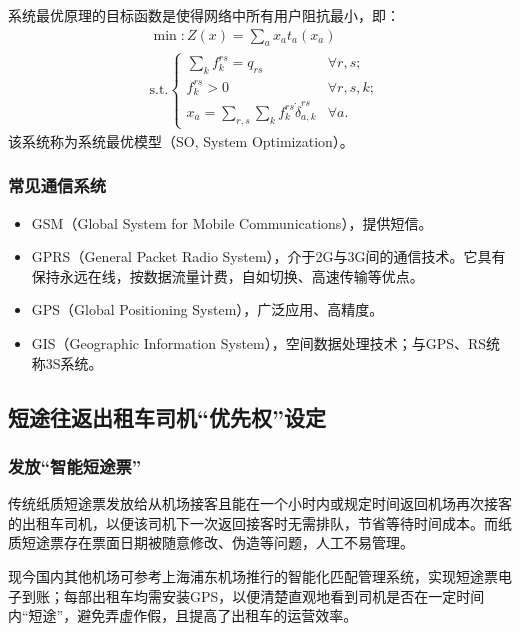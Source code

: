 系统最优原理的目标函数是使得网络中所有用户阻抗最小，即：
\begin{equation}\label{eq:最小用户阻抗}
    \begin{aligned}
        & \min: Z(x) = \sum_{a}x_{a}t_{a}(x_a) \\
        & \text{s.t.} \begin{cases}
            \sum_{k}f_{k}^{rs} = q_{rs} & \forall r,s; \\
            f_{k}^{rs} > 0 & \forall r,s,k; \\
            x_a = \sum_{r,s}\sum_k f_{k}^{rs}\dot\delta_{a,k}^{rs} & \forall a.
        \end{cases}
    \end{aligned}
\end{equation}
该系统称为系统最优模型（SO, System Optimization）。

\subsubsection{常见通信系统}
\begin{itemize}
    \item GSM（Global System for Mobile Communications），提供短信。
    
    \item GPRS（General Packet Radio System），介于2G与3G间的通信技术。它具有保持永远在线，按数据流量计费，自如切换、高速传输等优点。
    
    \item GPS（Global Positioning System），广泛应用、高精度。
    
    \item GIS（Geographic Information System），空间数据处理技术；与GPS、RS统称3S系统。
\end{itemize}

\subsection{短途往返出租车司机``优先权''设定}
\subsubsection{发放``智能短途票''}
传统纸质短途票发放给从机场接客且能在一个小时内或规定时间返回机场再次接客的出租车司机，以便该司机下一次返回接客时无需排队，节省等待时间成本。而纸质短途票存在票面日期被随意修改、伪造等问题，人工不易管理。

现今国内其他机场可参考上海浦东机场推行的智能化匹配管理系统，实现短途票电子到账；每部出租车均需安装GPS，以便清楚直观地看到司机是否在一定时间内``短途''，避免弄虚作假，且提高了出租车的运营效率。

